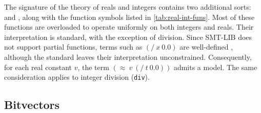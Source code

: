 The signature of the theory of reals and integers contains two additional sorts:  and  , along with the function symbols listed in \cref{tab:real-int-funs}.
Most of these functions are overloaded to operate uniformly on both integers and reals.
Their interpretation is standard, with the exception of division. 
Since SMT-LIB does not support partial functions, terms such as \((/~x~0.0)\) are well-defined , although the standard leaves their interpretation unconstrained.
Consequently, for each real constant \(v\), the term \((\approx~v~(/~t~0.0))\) admits a model.
The same consideration applies to integer division (\texttt{div}).

\subsection{Bitvectors}

